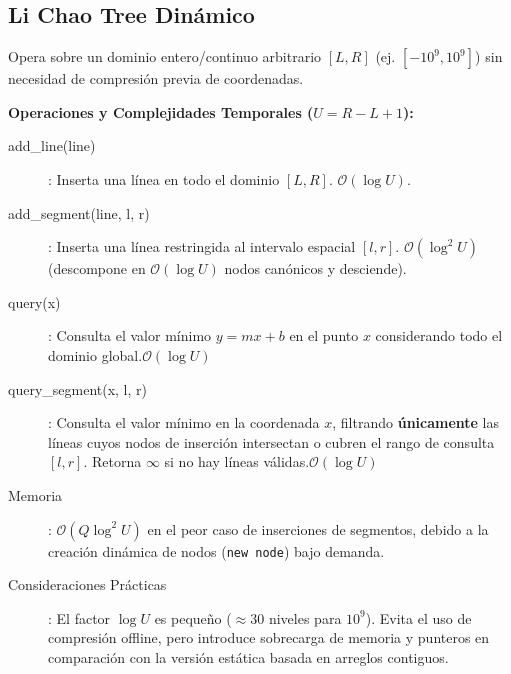 




\subsection*{Li Chao Tree Dinámico}
\begin{extended}
Opera sobre un dominio entero/continuo arbitrario $[L, R]$ (ej. $[-10^9, 10^9]$) sin necesidad de compresión previa de coordenadas.

\textbf{Operaciones y Complejidades Temporales ($U = R - L + 1$):}
\begin{description}
   \item[add\_line(line)]: Inserta una línea en todo el dominio $[L, R]$. $\mathcal{O}(\log U)$.
   \item[add\_segment(line, l, r)]: Inserta una línea restringida al intervalo espacial $[l, r]$. $\mathcal{O}(\log^2 U)$ (descompone en $\mathcal{O}(\log U)$ nodos canónicos y desciende).
   \item[query(x)]: Consulta el valor mínimo $y = mx + b$ en el punto $x$ considerando todo el dominio global.$\mathcal{O}(\log U)$
   \item[query\_segment(x, l, r)]: Consulta el valor mínimo en la coordenada $x$, filtrando \textbf{únicamente} las líneas cuyos nodos de inserción intersectan o cubren el rango de consulta $[l, r]$. Retorna $\infty$ si no hay líneas válidas.$\mathcal{O}(\log U)$
   \item[Memoria]: $\mathcal{O}(Q \log^2 U)$ en el peor caso de inserciones de segmentos, debido a la creación dinámica de nodos (\texttt{new node}) bajo demanda.
   \item [Consideraciones Prácticas]: El factor $\log U$ es pequeño ($\approx 30$ niveles para $10^9$). Evita el uso de compresión offline, pero introduce sobrecarga de memoria y punteros en comparación con la versión estática basada en arreglos contiguos.
\end{description}
\end{extended}

